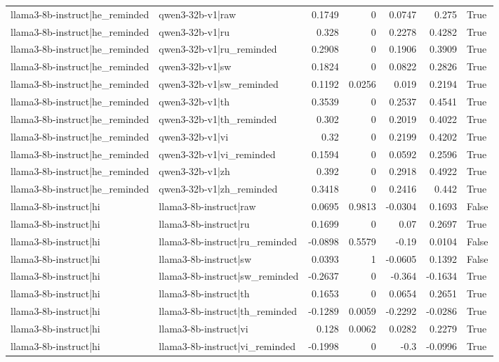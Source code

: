 \begin{table}
\begin{tabular}{l l r r r r l}
llama3-8b-instruct|he_reminded & qwen3-32b-v1|raw & 0.1749 & 0 & 0.0747 & 0.275 & True \\
llama3-8b-instruct|he_reminded & qwen3-32b-v1|ru & 0.328 & 0 & 0.2278 & 0.4282 & True \\
llama3-8b-instruct|he_reminded & qwen3-32b-v1|ru_reminded & 0.2908 & 0 & 0.1906 & 0.3909 & True \\
llama3-8b-instruct|he_reminded & qwen3-32b-v1|sw & 0.1824 & 0 & 0.0822 & 0.2826 & True \\
llama3-8b-instruct|he_reminded & qwen3-32b-v1|sw_reminded & 0.1192 & 0.0256 & 0.019 & 0.2194 & True \\
llama3-8b-instruct|he_reminded & qwen3-32b-v1|th & 0.3539 & 0 & 0.2537 & 0.4541 & True \\
llama3-8b-instruct|he_reminded & qwen3-32b-v1|th_reminded & 0.302 & 0 & 0.2019 & 0.4022 & True \\
llama3-8b-instruct|he_reminded & qwen3-32b-v1|vi & 0.32 & 0 & 0.2199 & 0.4202 & True \\
llama3-8b-instruct|he_reminded & qwen3-32b-v1|vi_reminded & 0.1594 & 0 & 0.0592 & 0.2596 & True \\
llama3-8b-instruct|he_reminded & qwen3-32b-v1|zh & 0.392 & 0 & 0.2918 & 0.4922 & True \\
llama3-8b-instruct|he_reminded & qwen3-32b-v1|zh_reminded & 0.3418 & 0 & 0.2416 & 0.442 & True \\
llama3-8b-instruct|hi & llama3-8b-instruct|raw & 0.0695 & 0.9813 & -0.0304 & 0.1693 & False \\
llama3-8b-instruct|hi & llama3-8b-instruct|ru & 0.1699 & 0 & 0.07 & 0.2697 & True \\
llama3-8b-instruct|hi & llama3-8b-instruct|ru_reminded & -0.0898 & 0.5579 & -0.19 & 0.0104 & False \\
llama3-8b-instruct|hi & llama3-8b-instruct|sw & 0.0393 & 1 & -0.0605 & 0.1392 & False \\
llama3-8b-instruct|hi & llama3-8b-instruct|sw_reminded & -0.2637 & 0 & -0.364 & -0.1634 & True \\
llama3-8b-instruct|hi & llama3-8b-instruct|th & 0.1653 & 0 & 0.0654 & 0.2651 & True \\
llama3-8b-instruct|hi & llama3-8b-instruct|th_reminded & -0.1289 & 0.0059 & -0.2292 & -0.0286 & True \\
llama3-8b-instruct|hi & llama3-8b-instruct|vi & 0.128 & 0.0062 & 0.0282 & 0.2279 & True \\
llama3-8b-instruct|hi & llama3-8b-instruct|vi_reminded & -0.1998 & 0 & -0.3 & -0.0996 & True \\

\end{tabular}
\end{table}
